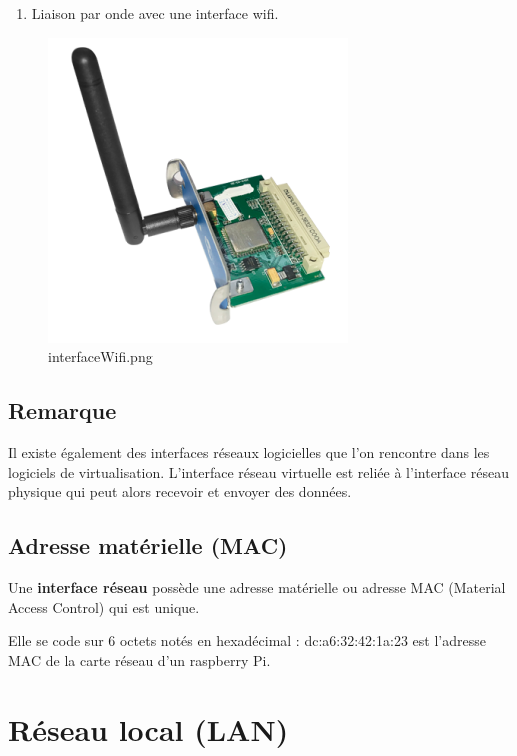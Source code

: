 \documentclass[11pt]{article}
\providecommand{\tightlist}{%
      \setlength{\itemsep}{0pt}\setlength{\parskip}{0pt}}
\begin{document}
    \begin{enumerate}
\def\labelenumi{\arabic{enumi}.}
\setcounter{enumi}{1}
\tightlist
\item
  Liaison par onde avec une interface wifi.
\end{enumerate}

    \begin{figure}
\centering
\includegraphics{img/interfaceWifi.png}
\caption{interfaceWifi.png}
\end{figure}

    \hypertarget{remarque}{%
\subsection{Remarque}\label{remarque}}

Il existe également des interfaces réseaux logicielles que l'on
rencontre dans les logiciels de virtualisation. L'interface réseau
virtuelle est reliée à l'interface réseau physique qui peut alors
recevoir et envoyer des données.

\hypertarget{adresse-matuxe9rielle-mac}{%
\subsection{Adresse matérielle
(MAC)}\label{adresse-matuxe9rielle-mac}}

Une \textbf{interface réseau} possède une adresse matérielle ou adresse
MAC (Material Access Control) qui est unique.

Elle se code sur 6 octets notés en hexadécimal : dc:a6:32:42:1a:23 est
l'adresse MAC de la carte réseau d'un raspberry Pi.

    \hypertarget{ruxe9seau-local-lan}{%
\section{Réseau local (LAN)}\label{ruxe9seau-local-lan}}
\end{document}
